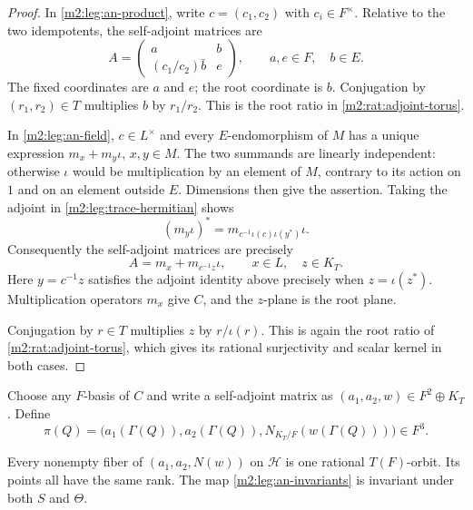 \begin{proof}
In \eqref{m2:leg:an-product}, write $c=(c_1,c_2)$ with $c_i\in F^\times$.
Relative to the two idempotents, the self-adjoint matrices are
\begin{equation}\label{m2:leg:product-selfadjoint}
 A=\begin{pmatrix}a&b\\(c_1/c_2)\bar b&e\end{pmatrix},
 \qquad a,e\in F,\quad b\in E.
\end{equation}
The fixed coordinates are $a$ and $e$; the root coordinate is $b$.
Conjugation by $(r_1,r_2)\in T$ multiplies $b$ by $r_1/r_2$.
This is the root ratio in \cref{m2:rat:adjoint-torus}.

In \eqref{m2:leg:an-field}, $c\in L^\times$ and every $E$-endomorphism
of $M$ has a unique expression $m_x+m_y\iota$, $x,y\in M$.
The two summands are linearly independent: otherwise $\iota$ would
be multiplication by an element of $M$, contrary to its action on $1$
and on an element outside $E$. Dimensions then give the assertion.
Taking the adjoint in \eqref{m2:leg:trace-hermitian} shows
\[
 (m_y\iota)^*=m_{c^{-1}\iota(c)\iota(y^*)}\iota.
\]
Consequently the self-adjoint matrices are precisely
\begin{equation}\label{m2:leg:field-selfadjoint}
 A=m_x+m_{c^{-1}z}\iota,\qquad x\in L,\quad z\in K_T.
\end{equation}
Here $y=c^{-1}z$ satisfies the adjoint identity above precisely
when $z=\iota(z^*)$. Multiplication operators $m_x$ give $C$, and
the $z$-plane is the root plane.

Conjugation by $r\in T$ multiplies $z$ by $r/\iota(r)$.
This is again the root ratio of \cref{m2:rat:adjoint-torus},
which gives its rational surjectivity and scalar kernel in both cases.
\end{proof}

Choose any $F$-basis of $C$ and write a self-adjoint matrix as
$(a_1,a_2,w)\in F^2\oplus K_T$. Define
\begin{equation}\label{m2:leg:an-invariants}
 \pi(Q)=\bigl(a_1(\Gamma(Q)),a_2(\Gamma(Q)),
                     N_{K_T/F}(w(\Gamma(Q)))\bigr)\in F^3.
\end{equation}

\begin{lemma}\label{m2:leg:gram-orbits}
Every nonempty fiber of $(a_1,a_2,N(w))$ on $\mathcal H$ is one
rational $T(F)$-orbit. Its points all have the same rank.
The map \eqref{m2:leg:an-invariants} is invariant under both $S$ and
$\Theta$.
\end{lemma}

